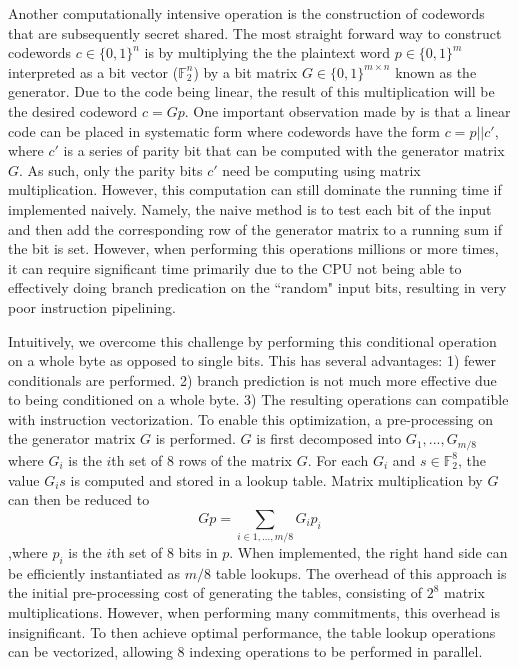 Another computationally intensive operation is the construction of codewords that are subsequently secret shared. The most straight forward way to construct codewords $c\in\{0,1\}^n$ is by multiplying the the plaintext word $p\in\{0,1\}^m$ interpreted as a bit vector ($\mathbb{F}_2^n$) by a bit matrix $G\in\{0,1\}^{m\times n}$ known as the generator. Due to the code being linear, the result of this multiplication will be the desired codeword $c=Gp$. One important observation made by \cite{DBLP:conf/tcc/FrederiksenJNT16} is that a linear code can be placed in systematic form where codewords have the form $c=p||c'$, where $c'$ is a series of parity bit that can be computed with the generator matrix $G$. As such, only the parity bits $c'$ need be computing using matrix multiplication. However, this computation can still dominate the running time if implemented naively. Namely, the naive method is to test each bit of the input and then add the corresponding row of the generator matrix to a running sum if the bit is set. However, when performing this operations millions or more times, it can require significant time primarily due to the CPU not being able to effectively doing branch predication on the ``random" input bits, resulting in very poor instruction pipelining. 

Intuitively, we overcome this challenge by performing this conditional operation on a whole byte as opposed to single bits. This has several advantages: 1) fewer conditionals are performed. 2) branch prediction is not much more effective due to being conditioned on a whole byte.  3) The resulting operations can compatible with instruction vectorization. To enable this optimization, a pre-processing on the generator matrix $G$ is performed. $G$ is first decomposed into $G_1,...,G_{m/8}$ where $G_i$ is the $i$th set of 8 rows of the matrix $G$. For each $G_i$ and $s\in\mathbb{F}_2^8$, the value $G_is$ is computed and stored in a lookup table. Matrix multiplication by $G$ can then be reduced to
\[
   Gp = \sum_{i\in {1,...,m/8}} G_ip_i
\] 
,where $p_i$ is the $i$th set of 8 bits in $p$. When implemented, the right hand side can be efficiently instantiated as $m/8$ table lookups. The overhead of this approach is the initial pre-processing cost of generating the tables, consisting of $2^8$ matrix multiplications. However, when performing many commitments, this overhead is insignificant. To then achieve optimal performance, the table lookup operations can be vectorized, allowing 8 indexing operations to be performed in parallel. 

